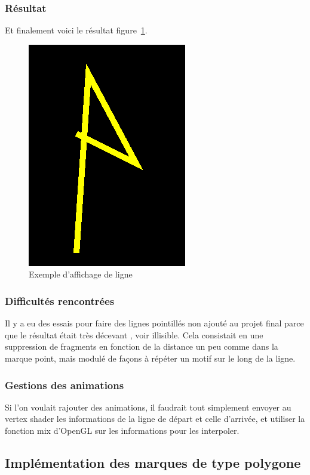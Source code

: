 \documentclass[12pt]{article}
\begin{document}
\subsubsection{Résultat}
Et finalement voici le résultat figure~\ref{fig:line}.
\begin{figure}[htp]
  \centering
  \includegraphics[scale=0.8]{images/line_example}
  \caption{Exemple d'affichage de ligne}
  \label{fig:line}
\end{figure}

\subsubsection{Difficultés rencontrées}
Il y a eu des essais pour faire des lignes pointillés non ajouté au projet final parce que le résultat était très décevant , 
voir illisible. Cela consistait en une suppression de fragments en fonction de la distance un peu comme dans la marque point, 
mais modulé de façons à répéter un motif sur le long de la ligne.

\subsubsection{Gestions des animations}
Si l'on voulait rajouter des animations, il faudrait tout simplement envoyer au vertex shader
les informations de la ligne de départ et celle d'arrivée, et utiliser la fonction mix d'OpenGL
sur les informations pour les interpoler.

\subsection{Implémentation des marques de type polygone}
\end{document}
